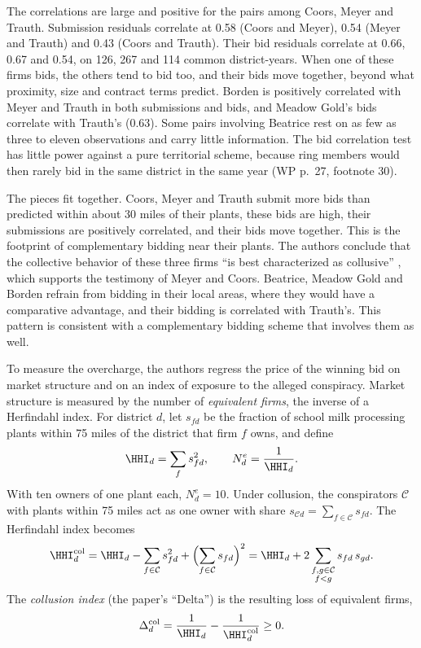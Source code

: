The correlations are large and positive for the pairs among Coors, Meyer and Trauth. Submission residuals correlate
at 0.58 (Coors and Meyer), 0.54 (Meyer and Trauth) and 0.43 (Coors and Trauth). Their bid residuals correlate at
0.66, 0.67 and 0.54, on 126, 267 and 114 common district-years. When one of these firms bids, the others tend to bid
too, and their bids move together, beyond what proximity, size and contract terms predict. Borden is positively
correlated with Meyer and Trauth in both submissions and bids, and Meadow Gold's bids correlate with Trauth's (0.63).
Some pairs involving Beatrice rest on as few as three to eleven observations and carry little information. The bid
correlation test has little power against a pure territorial scheme, because ring members would then rarely bid in
the same district in the same year (WP p.~27, footnote 30).

The pieces fit together. Coors, Meyer and Trauth submit more bids than predicted within about 30 miles of their
plants, these bids are high, their submissions are positively correlated, and their bids move together. This is the
footprint of complementary bidding near their plants. The authors conclude that the collective behavior of these
three firms ``is best characterized as collusive'' \citep[p.~28]{PorterZona1999}, which supports the testimony of
Meyer and Coors. Beatrice, Meadow Gold and Borden refrain from bidding in their local areas, where they would have a
comparative advantage, and their bidding is correlated with Trauth's. This pattern is consistent with a
complementary bidding scheme that involves them as well.

To measure the overcharge, the authors regress the price of the winning bid on market structure and on an index of
exposure to the alleged conspiracy. Market structure is measured by the number of \emph{equivalent firms}, the
inverse of a Herfindahl index. For district $d$, let $s_{fd}$ be the fraction of school milk processing plants within
75 miles of the district that firm $f$ owns, and define
\begin{equation}\label{eq:13-pz99-equiv}
  \HHI_d = \sum_f s_{fd}^2, \qquad N^e_d = \frac{1}{\HHI_d} .
\end{equation}
With ten owners of one plant each, $N^e_d = 10$. Under collusion, the conspirators $\mathcal{C}$ with plants within
75 miles act as one owner with share $s_{\mathcal{C}d} = \sum_{f\in\mathcal{C}}s_{fd}$. The Herfindahl index becomes
\begin{equation*}
  \HHI^{\mathrm{col}}_d = \HHI_d - \sum_{f\in\mathcal{C}}s_{fd}^2 + \Bigl(\sum_{f\in\mathcal{C}}s_{fd}\Bigr)^2
  = \HHI_d + 2\sum_{\substack{f, g\in\mathcal{C}\\ f < g}}s_{fd}\,s_{gd} .
\end{equation*}
The \emph{collusion index} (the paper's ``Delta'') is the resulting loss of equivalent firms,
\begin{equation}\label{eq:13-pz99-delta}
  \Delta^{\mathrm{col}}_d = \frac{1}{\HHI_d} - \frac{1}{\HHI^{\mathrm{col}}_d} \geq 0 .
\end{equation}

